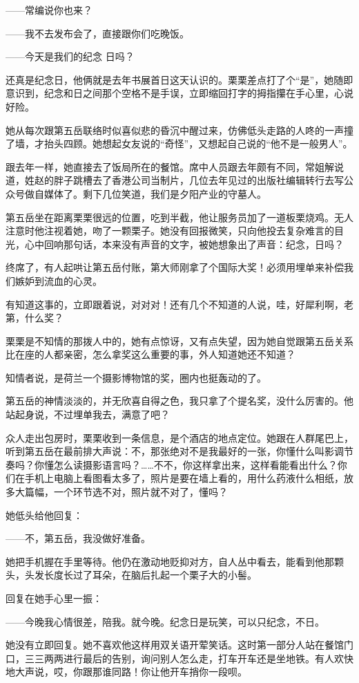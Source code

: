\documentclass[lang=cn,newtx,12pt,scheme=chinese]{elegantbook}
\begin{document}
——常编说你也来？

——我不去发布会了，直接跟你们吃晚饭。

——今天是我们的纪念 日吗？

还真是纪念日，他俩就是去年书展首日这天认识的。栗栗差点打了个“是”，她随即意识到，纪念和日之间那个空格不是手误，立即缩回打字的拇指攥在手心里，心说好险。

她从每次跟第五岳联络时似喜似悲的昏沉中醒过来，仿佛低头走路的人咚的一声撞了墙，才抬头四顾。她想起女友说的“奇怪”，又想起自己说的“他不是一般男人”。

跟去年一样，她直接去了饭局所在的餐馆。席中人员跟去年颇有不同，常姐解说道，姓赵的胖子跳槽去了香港公司当制片，几位去年见过的出版社编辑转行去写公众号做自媒体了。剩下几位笑道，我们是夕阳产业的守墓人。

第五岳坐在距离栗栗很远的位置，吃到半截，他让服务员加了一道板栗烧鸡。无人注意时他注视着她，吻了一颗栗子。她没有回报微笑，只向他投去复杂难言的目光，心中回响那句话，本来没有声音的文字，被她想象出了声音：纪念，日吗？

终席了，有人起哄让第五岳付账，第大师刚拿了个国际大奖！必须用埋单来补偿我们嫉妒到流血的心灵。

有知道这事的，立即跟着说，对对对！还有几个不知道的人说，哇，好犀利啊，老第，什么奖？

栗栗是不知情的那拨人中的，她有点惊讶，又有点失望，因为她自觉跟第五岳关系比在座的人都亲密，怎么拿奖这么重要的事，外人知道她还不知道？

知情者说，是荷兰一个摄影博物馆的奖，圈内也挺轰动的了。

第五岳的神情淡淡的，并无欣喜自得之色，我只拿了个提名奖，没什么厉害的。他站起身说，不过埋单我去，满意了吧？

众人走出包房时，栗栗收到一条信息，是个酒店的地点定位。她跟在人群尾巴上，听到第五岳在最前排大声说：不，那张绝对不是我最好的一张，你懂什么叫影调节奏吗？你懂怎么读摄影语言吗？……不不，你这样拿出来，这样看能看出什么？你们在手机上电脑上看图看太多了，照片是要在墙上看的，用什么药液什么相纸，放多大篇幅，一个环节选不对，照片就不对了，懂吗？

她低头给他回复：

——不，第五岳，我没做好准备。

她把手机握在手里等待。他仍在激动地贬抑对方，自人丛中看去，能看到他那颗头，头发长度长过了耳朵，在脑后扎起一个栗子大的小髻。

回复在她手心里一振：

——今晚我心情很差，陪我。就今晚。纪念日是玩笑，可以只纪念，不日。

她没有立即回复。她不喜欢他这样用双关语开荤笑话。这时第一部分人站在餐馆门口，三三两两进行最后的告别，询问别人怎么走，打车开车还是坐地铁。有人欢快地大声说，哎，你跟那谁同路！你让他开车捎你一段呗。
\end{document}
